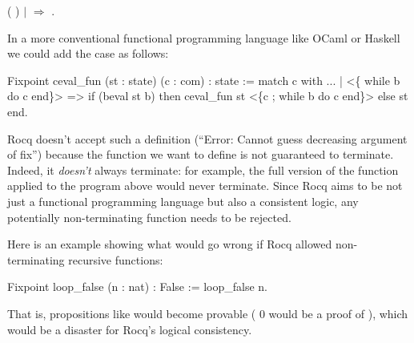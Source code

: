 \documentclass[12pt]{report}
\begin{document}
\begin{coqdoccode}
\coqdocindent{4.00em}
 (  )\coqdoceol
\coqdocindent{5.00em}
   \coqdoceol
\coqdocindent{5.00em}
   \coqdoceol
\coqdocindent{2.00em}
\ensuremath{|}        \ensuremath{\Rightarrow}\coqdoceol
\coqdocindent{4.00em}
  \coqdoceol
\coqdocindent{1.00em}
.\coqdoceol
\coqdocemptyline
\end{coqdoccode}
In a more conventional functional programming language like OCaml or
    Haskell we could add the  case as follows:


        Fixpoint ceval\_fun (st : state) (c : com) : state :=
          match c with
            ...
            | <\{ while b do c end\}> =>
                if (beval st b)
                  then ceval\_fun st <\{c ; while b do c end\}>
                  else st
          end.


    Rocq doesn't accept such a definition (``Error: Cannot guess
    decreasing argument of fix'') because the function we want to
    define is not guaranteed to terminate. Indeed, it \textit{doesn't} always
    terminate: for example, the full version of the 
    function applied to the  program above would never
    terminate. Since Rocq aims to be not just a functional programming
    language but also a consistent logic, any potentially
    non-terminating function needs to be rejected.


    Here is an example showing what would go wrong if Rocq allowed
    non-terminating recursive functions:


         Fixpoint loop\_false (n : nat) : False := loop\_false n.


    That is, propositions like  would become provable
    ( 0 would be a proof of ), which would be
    a disaster for Rocq's logical consistency.
\end{document}
